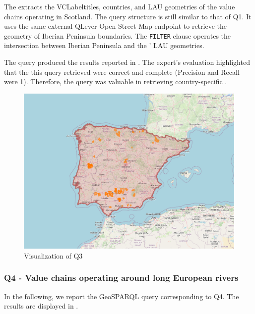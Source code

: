 The  extracts the \acrshort{VCLabel}titles, countries, and LAU geometries of the value chains operating in Scotland. The query structure is still similar to that of Q1. It uses the same external QLever Open Street Map endpoint to retrieve the geometry of Iberian Peninsula boundaries. The \texttt{FILTER} clause operates the intersection between Iberian Peninsula and the ' LAU geometries. 

The query produced the results reported in . The expert's evaluation highlighted that the  this query retrieved were correct and complete (Precision and Recall were 1). Therefore, the query was valuable in retrieving country-specific .


\begin{figure}[h!tb]
    \centerline {\includegraphics[scale=0.6]{img/iberian.png}}
    \caption{Visualization of Q3}
    \label{fig:iberian}
\end{figure}

\subsubsection{Q4 - Value chains operating around long European rivers}
In the following, we report the GeoSPARQL query corresponding to Q4. The results are displayed in .


